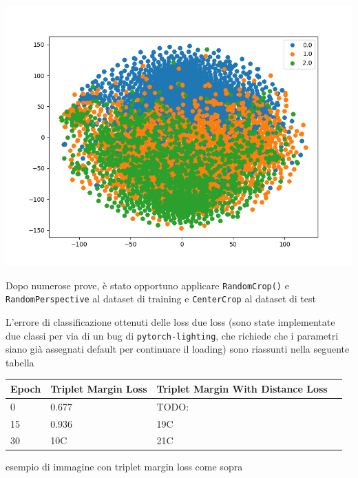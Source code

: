 \documentclass[11pt]{article}
\begin{document}
\begin{center}
\begin{minipage}{0.3\linewidth}
    \includegraphics[width=\linewidth]{09.png}
    \end{minipage}
\end{center}

Dopo numerose prove, è stato opportuno applicare \texttt{RandomCrop()} e \texttt{RandomPerspective} al dataset di training e \texttt{CenterCrop} al dataset di test

L'errore di classificazione ottenuti delle loss due loss (sono state implementate due classi per via di un bug di \texttt{pytorch-lighting},
che richiede che i parametri siano già assegnati default per continuare il loading) sono riassunti nella seguente tabella

\begin{center}
    \begin{tabular}{ | l | l | l | p{5cm} |}
    \hline
    Epoch & Triplet Margin Loss & Triplet Margin With Distance Loss \\ \hline
    0 & 0.677 & TODO: \\ \hline
    15 & 0.936 & 19C \\ \hline
    30 & 10C & 21C  \\
    \hline
    \end{tabular}
\end{center}

\begin{center}
    esempio di immagine con triplet margin loss come sopra
\end{center}
\end{document}
